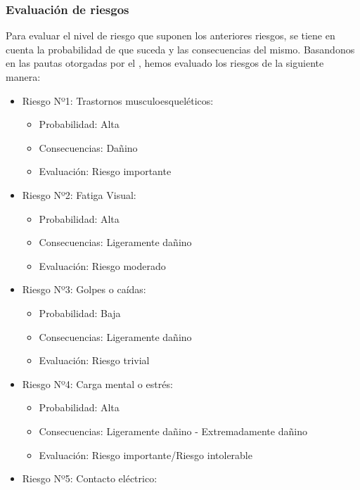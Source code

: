 \subsubsection{Evaluación de riesgos}
Para evaluar el nivel de riesgo que suponen los anteriores riesgos, se tiene en cuenta la probabilidad de que suceda
y las consecuencias del mismo. Basandonos en las pautas otorgadas por el \href{https://www.insst.es/documents/94886/96076/Evaluacion_riesgos.pdf/1371c8cb-7321-48c0-880b-611f6f380c1d?t=1526651610041}{\color{red}{INSST}},
hemos evaluado los riesgos de la siguiente manera: \\
\begin{itemize}
    \item Riesgo Nº1: Trastornos musculoesqueléticos: \begin{itemize}
              \item Probabilidad: Alta
              \item Consecuencias: Dañino
              \item Evaluación: Riesgo importante
          \end{itemize}
    \item Riesgo Nº2: Fatiga Visual: \begin{itemize}
              \item Probabilidad: Alta
              \item Consecuencias: Ligeramente dañino
              \item Evaluación: Riesgo moderado
          \end{itemize}
    \item Riesgo Nº3: Golpes o caídas: \begin{itemize}
              \item Probabilidad: Baja
              \item Consecuencias: Ligeramente dañino
              \item Evaluación: Riesgo trivial
          \end{itemize}
    \item Riesgo Nº4: Carga mental o estrés: \begin{itemize}
              \item Probabilidad: Alta
              \item Consecuencias: Ligeramente dañino - Extremadamente dañino
              \item Evaluación: Riesgo importante/Riesgo intolerable
          \end{itemize}
    \item Riesgo Nº5: Contacto eléctrico: \begin{itemize}

\end{itemize}
\end{itemize}
